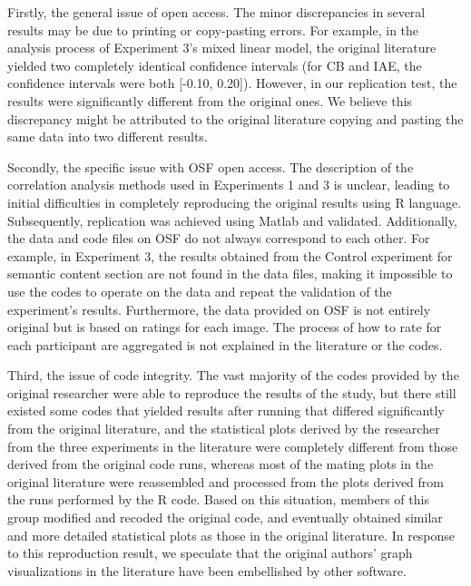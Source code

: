 \documentclass[
  man,floatsintext]{apa6}
\begin{document}
Firstly, the general issue of open access. The minor discrepancies in several results may be due to printing or copy-pasting errors. For example, in the analysis process of Experiment 3's mixed linear model, the original literature yielded two completely identical confidence intervals (for CB and IAE, the confidence intervals were both {[}-0.10, 0.20{]}). However, in our replication test, the results were significantly different from the original ones. We believe this discrepancy might be attributed to the original literature copying and pasting the same data into two different results.

Secondly, the specific issue with OSF open access. The description of the correlation analysis methods used in Experiments 1 and 3 is unclear, leading to initial difficulties in completely reproducing the original results using R language. Subsequently, replication was achieved using Matlab and validated. Additionally, the data and code files on OSF do not always correspond to each other. For example, in Experiment 3, the results obtained from the Control experiment for semantic content section are not found in the data files, making it impossible to use the codes to operate on the data and repeat the validation of the experiment's results. Furthermore, the data provided on OSF is not entirely original but is based on ratings for each image. The process of how to rate for each participant are aggregated is not explained in the literature or the codes.

Third, the issue of code integrity. The vast majority of the codes provided by the original researcher were able to reproduce the results of the study, but there still existed some codes that yielded results after running that differed significantly from the original literature, and the statistical plots derived by the researcher from the three experiments in the literature were completely different from those derived from the original code runs, whereas most of the mating plots in the original literature were reassembled and processed from the plots derived from the runs performed by the R code. Based on this situation, members of this group modified and recoded the original code, and eventually obtained similar and more detailed statistical plots as those in the original literature. In response to this reproduction result, we speculate that the original authors' graph visualizations in the literature have been embellished by other software.
\end{document}

